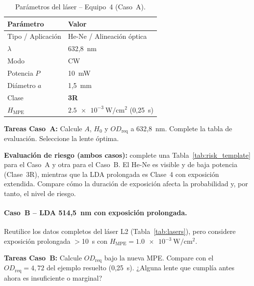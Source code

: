 \documentclass[12pt,a4paper]{article}
\begin{document}
\begin{table}[H]
	\centering
	\caption{Parámetros del láser -- Equipo~4 (Caso~A).}
	\small
	\begin{tabular}{l l}
		\toprule
		\textbf{Parámetro} & \textbf{Valor}                                        \\
		\midrule
		Tipo / Aplicación  & He-Ne / Alineación óptica                             \\
		$\lambda$          & 632,8~nm                                              \\
		Modo               & CW                                                    \\
		Potencia $P$       & 10~mW                                                 \\
		Diámetro $a$       & 1,5~mm                                                \\
		\rowcolor{aeroyellow!30}
		Clase              & \textbf{3R}                                           \\
		$H_{\mathrm{MPE}}$ & $\SI{2.5e-3}{\watt\per\centi\metre\squared}$ (0,25~s) \\
		\bottomrule
	\end{tabular}
\end{table}

\textbf{Tareas Caso~A:} Calcule $A$, $H_0$ y $OD_{\mathrm{req}}$ a 632,8~nm.
Complete la tabla de evaluación. Seleccione la lente óptima.

\textbf{Evaluación de riesgo (ambos casos):} complete una
Tabla~\ref{tab:risk_template} para el Caso~A y otra para el Caso~B. El He-Ne
es visible y de baja potencia (Clase~3R), mientras que la LDA prolongada es
Clase~4 con exposición extendida. Compare cómo la duración de exposición
afecta la probabilidad y, por tanto, el nivel de riesgo.

\paragraph{Caso~B -- LDA 514,5~nm con exposición prolongada.}

Reutilice los datos completos del láser L2 (Tabla~\ref{tab:lasers}), pero
considere exposición prolongada $>$10~s con
$H_{\mathrm{MPE}} = \SI{1.0e-3}{\watt\per\centi\metre\squared}$.

\textbf{Tareas Caso~B:} Calcule $OD_{\mathrm{req}}$ bajo la nueva MPE.
Compare con el $OD_{\mathrm{req}} = 4{,}72$ del ejemplo resuelto (0,25~s).
¿Alguna lente que cumplía antes ahora es insuficiente o marginal?
\end{document}
